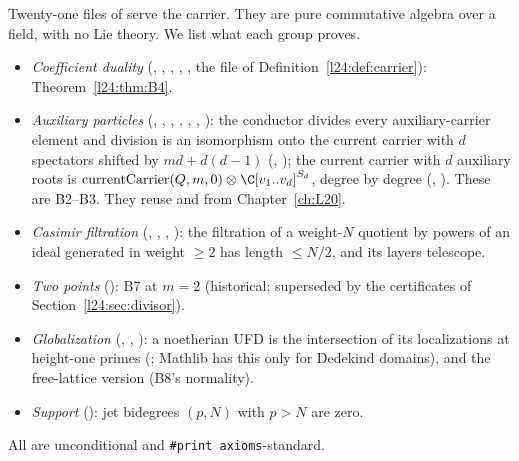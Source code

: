 Twenty-one files of  serve the carrier. They are pure commutative algebra over a
field, with no Lie theory. We list what each group proves.
\begin{itemize}
\item \emph{Coefficient duality} (, ,
  , , , the file of
  Definition~\ref{l24:def:carrier}): Theorem~\ref{l24:thm:B4}.
\item \emph{Auxiliary particles} (, ,
  , ,
  , ,
  ): the conductor divides every auxiliary-carrier element and division is
  an isomorphism onto the current carrier with $d$ spectators shifted by $md+d(d-1)$ (,
  ); the current carrier with $d$ auxiliary roots is
  $\mathrm{currentCarrier}(Q,m,0)\otimes\C[v_1..v_d]^{S_d}$, degree by degree (,
  ). These are B2--B3. They reuse  and
   from Chapter~\ref{ch:L20}.
\item \emph{Casimir filtration} (, ,
  , ): the filtration of a weight-$N$ quotient
  by powers of an ideal generated in weight $\ge2$ has length $\le N/2$, and its layers telescope.
\item \emph{Two points} (): B7 at $m=2$ (historical; superseded by the certificates
  of Section~\ref{l24:sec:divisor}).
\item \emph{Globalization} (, ,
  ): a noetherian UFD is the intersection of its localizations at height-one
  primes (; Mathlib has this only for Dedekind domains), and the free-lattice
  version (B8's normality).
\item \emph{Support} (): jet bidegrees $(p,N)$ with $p>N$ are zero.
\end{itemize}
All are unconditional and \texttt{\#print axioms}-standard.

